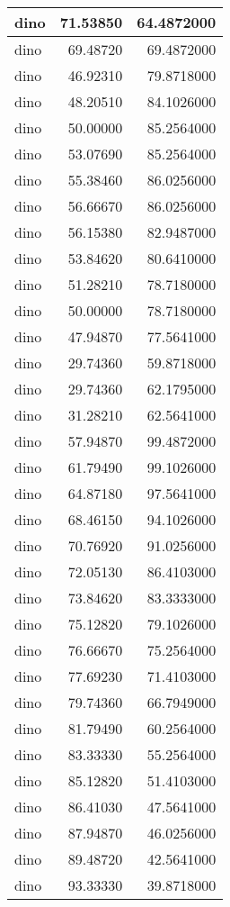 \documentclass[
]{book}
\theoremstyle{definition}
\theoremstyle{definition}
\theoremstyle{definition}
\theoremstyle{definition}
\theoremstyle{remark}
\begin{document}
\begin{tabular}{l|r|r}
\hline
dino & 71.53850 & 64.4872000\\
\hline
dino & 69.48720 & 69.4872000\\
\hline
dino & 46.92310 & 79.8718000\\
\hline
dino & 48.20510 & 84.1026000\\
\hline
dino & 50.00000 & 85.2564000\\
\hline
dino & 53.07690 & 85.2564000\\
\hline
dino & 55.38460 & 86.0256000\\
\hline
dino & 56.66670 & 86.0256000\\
\hline
dino & 56.15380 & 82.9487000\\
\hline
dino & 53.84620 & 80.6410000\\
\hline
dino & 51.28210 & 78.7180000\\
\hline
dino & 50.00000 & 78.7180000\\
\hline
dino & 47.94870 & 77.5641000\\
\hline
dino & 29.74360 & 59.8718000\\
\hline
dino & 29.74360 & 62.1795000\\
\hline
dino & 31.28210 & 62.5641000\\
\hline
dino & 57.94870 & 99.4872000\\
\hline
dino & 61.79490 & 99.1026000\\
\hline
dino & 64.87180 & 97.5641000\\
\hline
dino & 68.46150 & 94.1026000\\
\hline
dino & 70.76920 & 91.0256000\\
\hline
dino & 72.05130 & 86.4103000\\
\hline
dino & 73.84620 & 83.3333000\\
\hline
dino & 75.12820 & 79.1026000\\
\hline
dino & 76.66670 & 75.2564000\\
\hline
dino & 77.69230 & 71.4103000\\
\hline
dino & 79.74360 & 66.7949000\\
\hline
dino & 81.79490 & 60.2564000\\
\hline
dino & 83.33330 & 55.2564000\\
\hline
dino & 85.12820 & 51.4103000\\
\hline
dino & 86.41030 & 47.5641000\\
\hline
dino & 87.94870 & 46.0256000\\
\hline
dino & 89.48720 & 42.5641000\\
\hline
dino & 93.33330 & 39.8718000\\

\end{tabular}
\end{document}
